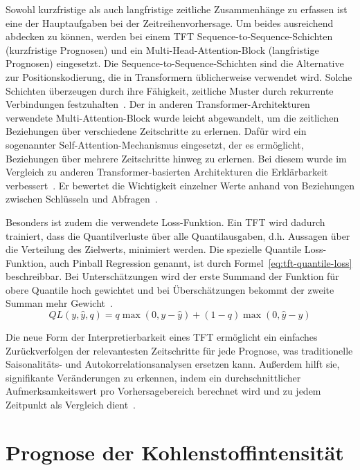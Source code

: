 Sowohl kurzfristige als auch langfristige zeitliche Zusammenhänge zu erfassen ist eine der Hauptaufgaben bei der Zeitreihenvorhersage.
Um beides ausreichend abdecken zu können, werden bei einem \ac{TFT} Sequence-to-Sequence-Schichten (kurzfristige Prognosen) und ein Multi-Head-Attention-Block (langfristige Prognosen) eingesetzt.
Die Sequence-to-Sequence-Schichten sind die Alternative zur Positionskodierung, die in Transformern üblicherweise verwendet wird.
Solche Schichten überzeugen durch ihre Fähigkeit, zeitliche Muster durch rekurrente Verbindungen festzuhalten~\cite{Labiadh.2023}.
Der in anderen Transformer-Architekturen verwendete Multi-Attention-Block wurde leicht abgewandelt, um die zeitlichen Beziehungen über verschiedene Zeitschritte zu erlernen.
Dafür wird ein sogenannter Self-Attention-Mechanismus eingesetzt, der es ermöglicht, Beziehungen über mehrere Zeitschritte hinweg zu erlernen.
Bei diesem wurde im Vergleich zu anderen Transformer-basierten Architekturen die Erklärbarkeit verbessert~\cite{Lim.19.12.2019}.
Er bewertet die Wichtigkeit einzelner Werte anhand von Beziehungen zwischen Schlüsseln und Abfragen~\cite{Labiadh.2023}.

Besonders ist zudem die verwendete Loss-Funktion.
Ein \ac{TFT} wird dadurch trainiert, dass die Quantilverluste über alle Quantilausgaben, d.h. Aussagen über die Verteilung des Zielwerts, minimiert werden.
Die spezielle Quantile Loss-Funktion, auch Pinball Regression genannt, ist durch Formel~\ref{eq:tft-quantile-loss} beschreibbar.
Bei Unterschätzungen wird der erste Summand der Funktion für obere Quantile hoch gewichtet und bei Überschätzungen bekommt der zweite Summan mehr Gewicht~\cite{Labiadh.2023}.
\begin{equation}
 \label{eq:tft-quantile-loss}
 QL(y, \hat{y}, q) = q \max(0, y - \hat{y}) + (1 - q) \max(0, \hat{y} - y)
\end{equation}

Die neue Form der Interpretierbarkeit eines \ac{TFT} ermöglicht ein einfaches Zurückverfolgen der relevantesten Zeitschritte für jede Prognose, was traditionelle Saisonalitäts- und Autokorrelationsanalysen ersetzen kann.
Außerdem hilft sie, signifikante Veränderungen zu erkennen, indem ein durchschnittlicher Aufmerksamkeitswert pro Vorhersagebereich berechnet wird und zu jedem Zeitpunkt als Vergleich dient~\cite{Labiadh.2023}.

\chapter{Prognose der Kohlenstoffintensität}
